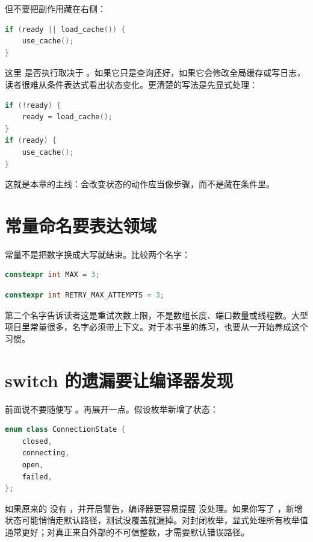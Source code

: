 但不要把副作用藏在右侧：

\begin{lstlisting}[language=C++,caption={短路隐藏副作用}]
if (ready || load_cache()) {
    use_cache();
}
\end{lstlisting}

这里  是否执行取决于 。如果它只是查询还好，如果它会修改全局缓存或写日志，读者很难从条件表达式看出状态变化。更清楚的写法是先显式处理：

\begin{lstlisting}[language=C++,caption={把副作用变成步骤}]
if (!ready) {
    ready = load_cache();
}
if (ready) {
    use_cache();
}
\end{lstlisting}

这就是本章的主线：会改变状态的动作应当像步骤，而不是藏在条件里。

\section{常量命名要表达领域}

常量不是把数字换成大写就结束。比较两个名字：

\begin{lstlisting}[language=C++,caption={弱常量名}]
constexpr int MAX = 3;
\end{lstlisting}

\begin{lstlisting}[language=C++,caption={带领域的常量名}]
constexpr int RETRY_MAX_ATTEMPTS = 3;
\end{lstlisting}

第二个名字告诉读者这是重试次数上限，不是数组长度、端口数量或线程数。大型项目里常量很多，名字必须带上下文。对于本书里的练习，也要从一开始养成这个习惯。

\section{switch 的遗漏要让编译器发现}

前面说不要随便写 。再展开一点。假设枚举新增了状态：

\begin{lstlisting}[language=C++,caption={新增状态}]
enum class ConnectionState {
    closed,
    connecting,
    open,
    failed,
};
\end{lstlisting}

如果原来的  没有 ，并开启警告，编译器更容易提醒  没处理。如果你写了 ，新增状态可能悄悄走默认路径，测试没覆盖就漏掉。对封闭枚举，显式处理所有枚举值通常更好；对真正来自外部的不可信整数，才需要默认错误路径。

